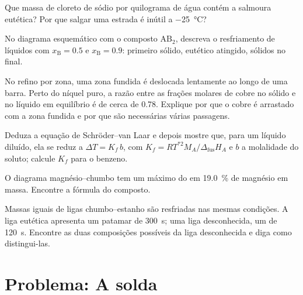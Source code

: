 \begin{exercise}[$\star\star$]\label{exo:b2:solid-liquid-diagrams:7}
Que massa de cloreto de sódio por quilograma de água contém a salmoura
eutética? Por que salgar uma estrada é inútil a \qty{-25}{\degreeCelsius}?
\end{exercise}

\begin{exercise}[$\star\star$]\label{exo:b2:solid-liquid-diagrams:8}
No diagrama esquemático com o composto $\mathrm{AB_2}$, descreva o
resfriamento de líquidos com $x_{\mathrm B} = 0.5$ e $x_{\mathrm B} = 0.9$:
primeiro sólido, eutético atingido, sólidos no final.
\end{exercise}

\begin{exercise}[$\star\star$]\label{exo:b2:solid-liquid-diagrams:9}
No refino por zona, uma zona fundida é deslocada lentamente ao longo de uma
barra. Perto do níquel puro, a razão entre as frações molares de cobre no
sólido e no líquido em equilíbrio é de cerca de 0.78. Explique por que o
cobre é arrastado com a zona fundida e por que são necessárias várias
passagens.
\end{exercise}

\begin{exercise}[$\star\star\star$]\label{exo:b2:solid-liquid-diagrams:10}
Deduza a equação de Schröder--van Laar e depois mostre que, para um líquido
diluído, ela se reduz a $\Delta T = K_f\,b$, com $K_f = RT^{*2}M_A/\Delta_{\text{fus}}H_A$
e $b$ a molalidade do soluto; calcule $K_f$ para o benzeno.
\end{exercise}

\begin{exercise}[$\star\star\star$]\label{exo:b2:solid-liquid-diagrams:11}
O diagrama magnésio--chumbo tem um máximo do  em 19.0~\% de magnésio
em massa. Encontre a fórmula do composto.
\end{exercise}

\begin{exercise}[$\star\star\star$]\label{exo:b2:solid-liquid-diagrams:12}
Massas iguais de ligas chumbo--estanho são resfriadas nas mesmas condições.
A liga eutética apresenta um patamar de \qty{300}{s}; uma liga desconhecida,
um de \qty{120}{s}. Encontre as duas composições possíveis da liga
desconhecida e diga como distingui-las.
\end{exercise}

\section{Problema: A solda}

